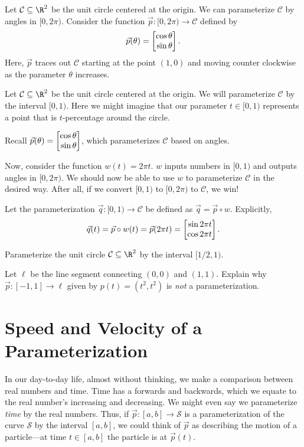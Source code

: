 \begin{example}[A Circle]
	Let $\mathcal C\subseteq \R^2$ be the unit circle centered at the origin.
	We can parameterize $\mathcal C$ by angles in $[0,2\pi)$.  Consider the function
	$\vec p:[0,2\pi)\to\mathcal C$ defined by
	\[
		\vec p(\theta) = \mat{\cos\theta \\\sin \theta}.	
	\]
	Here, $\vec p$ traces out $\mathcal C$ starting at the point $(1,0)$ and
	moving counter clockwise as the parameter $\theta$ increases.
\end{example}
\begin{example}
	Let $\mathcal C\subseteq \R^2$ be the unit circle centered at the origin.
	We will parameterize $\mathcal C$ by the interval $[0,1)$.  Here we might
	imagine that our parameter $t\in[0,1)$ represents a point that is $t$-percentage
	around the circle.  
	
	Recall $\vec p(\theta)=\mat{\cos \theta\\\sin\theta}$, which parameterizes
	$\mathcal C$ based on angles.
	
	Now, consider the function $w(t) =2\pi t$.
	$w$ inputs numbers in $[0,1)$ and outputs angles in $[0,2\pi)$.  We should
	now be able to use $w$ to parameterize $\mathcal C$ in the desired way.
	After all, if we convert $[0,1)$ to $[0,2\pi)$ to $\mathcal C$, we win!

	Let the parameterization
		$\vec q:[0,1)\to\mathcal C$ be defined as $\vec q=\vec p\circ w$.
	Explicitly,
	\[
		\vec q(t) = \vec p\circ w(t) = \vec p(2\pi t) = \mat{\sin 2\pi t\\\cos 2\pi t}.	
	\]
\end{example}

\begin{exercise}
	Parameterize the unit circle $\mathcal C\subseteq \R^2$ by the interval $[1/2,1)$.
\end{exercise}
\begin{exercise}
	Let $\ell$ be the line segment connecting $(0,0)$ and $(1,1)$.
	Explain why $\vec p:[-1,1]\to\ell$ given by $p(t)=(t^2,t^2)$ is \emph{not}
	a parameterization.
\end{exercise}

\section{Speed and Velocity of a Parameterization}

In our day-to-day life, almost without thinking, we make a comparison between real numbers
and time.  Time has a forwards and backwards, which we equate to
the real number's increasing and decreasing.  We might even say we parameterize \emph{time}
by the real numbers.  Thus, if $\vec p:[a,b]\to \mathcal S$ is a parameterization 
of the curve $\mathcal S$ by the interval $[a,b]$, we could think of $\vec p$ as describing
the motion of a particle---at time $t\in[a,b]$ the particle is at $\vec p(t)$.

